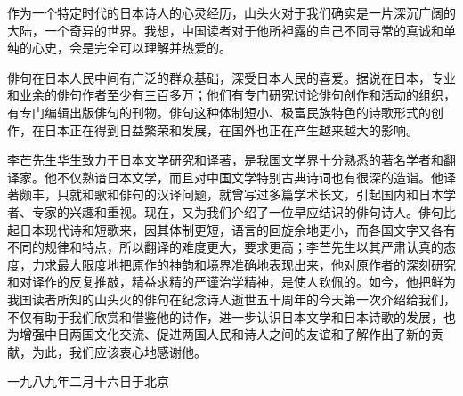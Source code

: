 {  作为一个特定时代的日本诗人的心灵经历，山头火对于我们确实是一片深沉广阔的大陆，一个奇异的世界。我想，中国读者对于他所袒露的自己不同寻常的真诚和单纯的心史，会是完全可以理解并热爱的。

  俳句在日本人民中间有广泛的群众基础，深受日本人民的喜爱。据说在日本，专业和业余的俳句作者至少有三百多万；他们有专门研究讨论俳句创作和活动的组织，有专门编辑出版俳句的刊物。俳句这种体制短小、极富民族特色的诗歌形式的创作，在日本正在得到日益繁荣和发展，在国外也正在产生越来越大的影响。

  李芒先生华生致力于日本文学研究和译著，是我国文学界十分熟悉的著名学者和翻译家。他不仅熟谙日本文学，而且对中国文学特别古典诗词也有很深的造诣。他译著颇丰，只就和歌和俳句的汉译问题，就曾写过多篇学术长文，引起国内和日本学者、专家的兴趣和重视。现在，又为我们介绍了一位早应结识的俳句诗人。俳句比起日本现代诗和短歌来，因其体制更短，语言的回旋余地更小，而各国文字又各有不同的规律和特点，所以翻译的难度更大，要求更高；李芒先生以其严肃认真的态度，力求最大限度地把原作的神韵和境界准确地表现出来，他对原作者的深刻研究和对译作的反复推敲，精益求精的严谨治学精神，是使人钦佩的。如今，他把鲜为我国读者所知的山头火的俳句在纪念诗人逝世五十周年的今天第一次介绍给我们，不仅有助于我们欣赏和借鉴他的诗作，进一步认识日本文学和日本诗歌的发展，也为增强中日两国文化交流、促进两国人民和诗人之间的友谊和了解作出了新的贡献，为此，我们应该衷心地感谢他。

  \bigskip

  \hfill 一九八九年二月十六日于北京
 }

